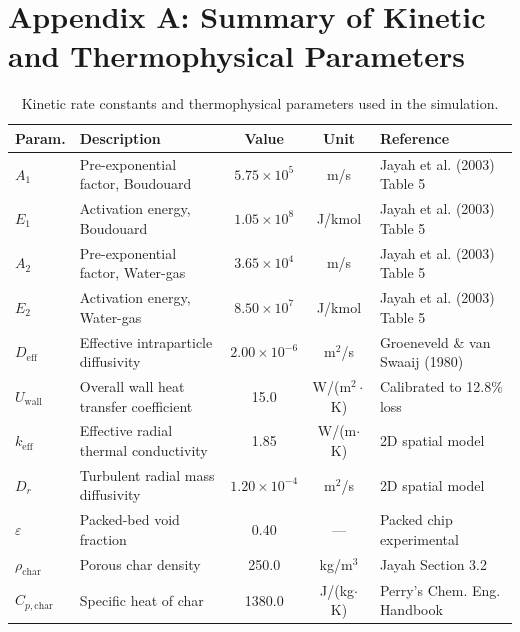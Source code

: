 \documentclass[11pt,a4paper]{article}
\begin{document}
\section{Appendix A: Summary of Kinetic and Thermophysical Parameters}
\begin{table}[H]
    \centering
    \caption{Kinetic rate constants and thermophysical parameters used in the simulation.}
    \label{tab:app_params}
    \small
    \begin{tabularx}{\textwidth}{lXccX}
        \toprule
        \textbf{Param.} & \textbf{Description} & \textbf{Value} & \textbf{Unit} & \textbf{Reference} \\
        \midrule
        $A_1$ & Pre-exponential factor, Boudouard & $5.75 \times 10^5$ & m/s & Jayah et al. (2003) Table 5 \\
        $E_1$ & Activation energy, Boudouard & $1.05 \times 10^8$ & J/kmol & Jayah et al. (2003) Table 5 \\
        $A_2$ & Pre-exponential factor, Water-gas & $3.65 \times 10^4$ & m/s & Jayah et al. (2003) Table 5 \\
        $E_2$ & Activation energy, Water-gas & $8.50 \times 10^7$ & J/kmol & Jayah et al. (2003) Table 5 \\
        $D_{\text{eff}}$ & Effective intraparticle diffusivity & $2.00 \times 10^{-6}$ & m$^2$/s & Groeneveld \& van Swaaij (1980) \\
        $U_{\text{wall}}$ & Overall wall heat transfer coefficient & 15.0 & W/(m$^2\cdot$K) & Calibrated to 12.8\% loss \\
        $k_{\text{eff}}$ & Effective radial thermal conductivity & 1.85 & W/(m$\cdot$K) & 2D spatial model \\
        $D_r$ & Turbulent radial mass diffusivity & $1.20 \times 10^{-4}$ & m$^2$/s & 2D spatial model \\
        $\varepsilon$ & Packed-bed void fraction & 0.40 & --- & Packed chip experimental \\
        $\rho_{\text{char}}$ & Porous char density & 250.0 & kg/m$^3$ & Jayah Section 3.2 \\
        $C_{p,\text{char}}$ & Specific heat of char & 1380.0 & J/(kg$\cdot$K) & Perry's Chem. Eng. Handbook \\
        \bottomrule
    \end{tabularx}
\end{table}
\end{document}
